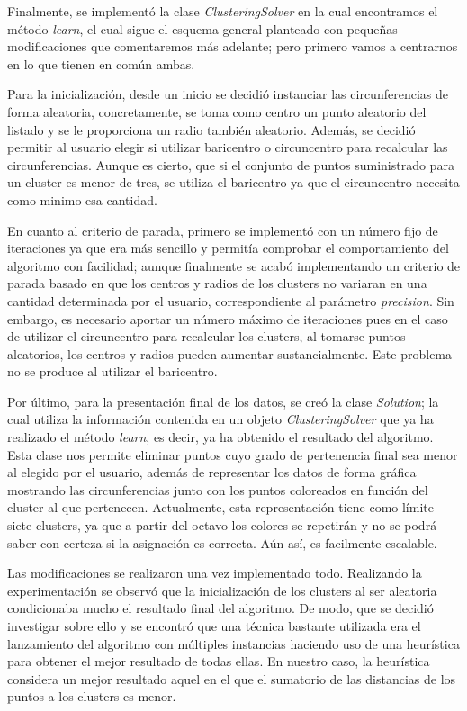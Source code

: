 \documentclass[conference,a4paper]{IEEEtran}
\begin{document}
Finalmente, se implementó la clase \textit{ClusteringSolver} en la cual encontramos el método \textit{learn}, el cual sigue el esquema general planteado con pequeñas modificaciones que comentaremos más adelante; pero primero vamos a centrarnos en lo que tienen en común ambas.

Para la inicialización, desde un inicio se decidió instanciar las circunferencias de forma aleatoria, concretamente, se toma como centro un punto aleatorio del listado y se le proporciona un radio también aleatorio. Además, se decidió permitir al usuario elegir si utilizar baricentro o circuncentro para recalcular las circunferencias. Aunque es cierto, que si el conjunto de puntos suministrado para un cluster es menor de tres, se utiliza el baricentro ya que el circuncentro necesita como minimo esa cantidad.

En cuanto al criterio de parada, primero se implementó con un número fijo de iteraciones ya que era más sencillo y permitía comprobar el comportamiento del algoritmo con facilidad; aunque finalmente se acabó implementando un criterio de parada basado en que los centros y radios de los clusters no variaran en una cantidad determinada por el usuario, correspondiente al parámetro \textit{precision}. Sin embargo, es necesario aportar un número máximo de iteraciones pues en el caso de utilizar el circuncentro para recalcular los clusters, al tomarse puntos aleatorios, los centros y radios pueden aumentar sustancialmente. Este problema no se produce al utilizar el baricentro.

Por último, para la presentación final de los datos, se creó la clase  \textit{Solution}; la cual utiliza la información contenida en un objeto \textit{ClusteringSolver} que ya ha realizado el método  \textit{learn}, es decir, ya ha obtenido el resultado del algoritmo. Esta clase nos permite eliminar puntos cuyo grado de pertenencia final sea menor al elegido por el usuario, además de representar los datos de forma gráfica mostrando las circunferencias junto con los puntos coloreados en función del cluster al que pertenecen. Actualmente, esta representación tiene como límite siete clusters, ya que a partir del octavo los colores se repetirán y no se podrá saber con certeza si la asignación es correcta. Aún así, es facilmente escalable.

Las modificaciones se realizaron una vez implementado todo. Realizando la experimentación se observó que la inicialización de los clusters al ser aleatoria condicionaba mucho el resultado final del algoritmo. De modo, que se decidió investigar sobre ello y se encontró que una técnica bastante utilizada era el lanzamiento del algoritmo con múltiples instancias haciendo uso de una heurística para obtener el mejor resultado de todas ellas. En nuestro caso, la heurística  considera un mejor resultado aquel en el que el sumatorio de las distancias de los puntos a los clusters es menor.
\end{document}
